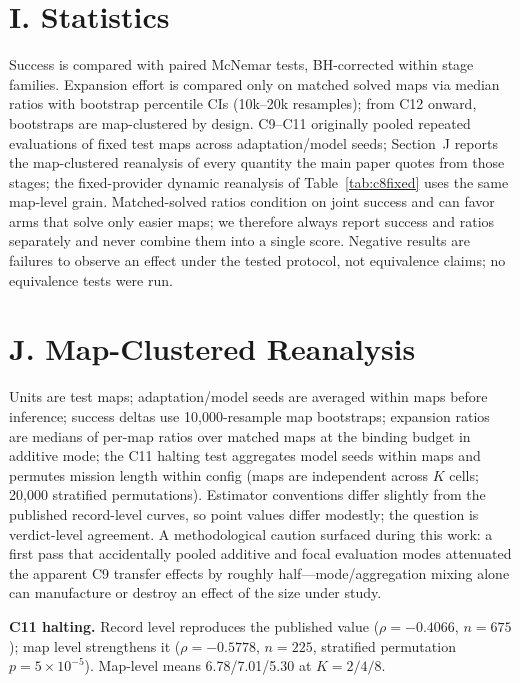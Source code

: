 \documentclass[letterpaper]{article} %
\newcommand{\stage}[1]{\textsc{#1}}
\begin{document}
\section{I. Statistics}

Success is compared with paired McNemar tests, BH-corrected within stage families. Expansion effort is compared only on matched solved maps via median ratios with bootstrap percentile CIs (10k--20k resamples); from \stage{C12} onward, bootstraps are map-clustered by design. \stage{C9}--\stage{C11} originally pooled repeated evaluations of fixed test maps across adaptation/model seeds; Section~J reports the map-clustered reanalysis of every quantity the main paper quotes from those stages; the fixed-provider dynamic reanalysis of Table~\ref{tab:c8fixed} uses the same map-level grain. Matched-solved ratios condition on joint success and can favor arms that solve only easier maps; we therefore always report success and ratios separately and never combine them into a single score. Negative results are failures to observe an effect under the tested protocol, not equivalence claims; no equivalence tests were run.

\section{J. Map-Clustered Reanalysis}

Units are test maps; adaptation/model seeds are averaged within maps before inference; success deltas use 10{,}000-resample map bootstraps; expansion ratios are medians of per-map ratios over matched maps at the binding budget in additive mode; the \stage{C11} halting test aggregates model seeds within maps and permutes mission length within config (maps are independent across $K$ cells; 20{,}000 stratified permutations). Estimator conventions differ slightly from the published record-level curves, so point values differ modestly; the question is verdict-level agreement. A methodological caution surfaced during this work: a first pass that accidentally pooled additive and focal evaluation modes attenuated the apparent \stage{C9} transfer effects by roughly half---mode/aggregation mixing alone can manufacture or destroy an effect of the size under study.

\textbf{\stage{C11} halting.} Record level reproduces the published value ($\rho{=}-0.4066$, $n{=}675$); map level strengthens it ($\rho{=}-0.5778$, $n{=}225$, stratified permutation $p{=}5{\times}10^{-5}$). Map-level means 6.78/7.01/5.30 at $K{=}2/4/8$.
\end{document}
